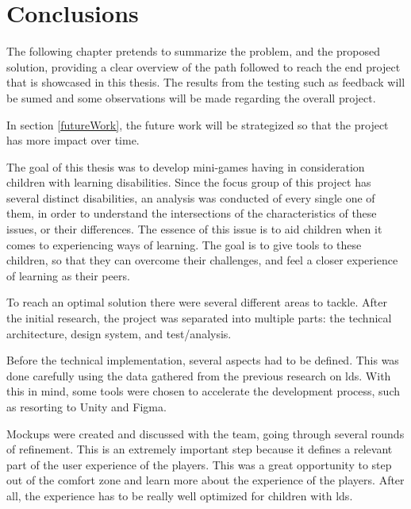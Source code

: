 \chapter{Conclusions}
\label{cha:conclusions}

The following chapter pretends to summarize the problem, and the proposed solution, providing a clear overview of the path followed to reach the end project that is showcased in this thesis.
The results from the testing such as feedback will be sumed and some observations will be made regarding the overall project.

In section \ref{futureWork}, the future work will be strategized so that the project has more impact over time.


The goal of this thesis was to develop mini-games having in consideration children with learning disabilities. Since the focus group of this project has several distinct disabilities, an analysis was conducted of every single one of them, in order to understand the intersections of the characteristics of these issues, or their differences. The essence of this issue is to aid children when it comes to experiencing ways of learning. The goal is to give tools to these children, so that they can overcome their challenges, and feel a closer experience of learning as their peers.

To reach an optimal solution there were several different areas to tackle. After the initial research, the project was separated into multiple parts: the technical architecture, design system, and test/analysis.

Before the technical implementation, several aspects had to be defined. This was done carefully using the data gathered from the previous research on \glspl{ld}. With this in mind, some tools were chosen to accelerate the development process, such as resorting to Unity and Figma.

Mockups were created and discussed with the team, going through several rounds of refinement. This is an extremely important step because it defines a relevant part of the user experience of the players. This was a great opportunity to step out of the comfort zone and learn more about the experience of the players. After all, the experience has to be really well optimized for children with \glspl{ld}.

